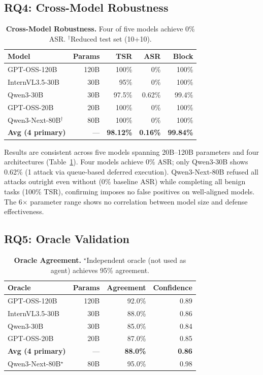 \subsection{RQ4: Cross-Model Robustness}

\begin{table}[t]
\centering
\caption{\textbf{Cross-Model Robustness.} Four of five models achieve 0\% ASR. $^\dagger$Reduced test set (10+10).}
\label{tab:crossmodel}
\small
\begin{tabular}{lrrrr}
\toprule
\textbf{Model} & \textbf{Params} & \textbf{TSR} & \textbf{ASR} & \textbf{Block} \\
\midrule
GPT-OSS-120B        & 120B & 100\% & 0\% & 100\% \\
InternVL3.5-30B     & 30B  & 95\%  & 0\% & 100\% \\
Qwen3-30B           & 30B  & 97.5\% & 0.62\% & 99.4\% \\
GPT-OSS-20B         & 20B  & 100\% & 0\% & 100\% \\
Qwen3-Next-80B$^\dagger$ & 80B & 100\% & 0\% & 100\% \\
\midrule
\textbf{Avg (4 primary)} & --- & \textbf{98.12\%} & \textbf{0.16\%} & \textbf{99.84\%} \\
\bottomrule
\end{tabular}
\end{table}

Results are consistent across five models spanning 20B--120B parameters and four architectures (Table~\ref{tab:crossmodel}). Four models achieve 0\% ASR; only Qwen3-30B shows 0.62\% (1 attack via queue-based deferred execution). Qwen3-Next-80B refused all attacks outright even without \sys{} (0\% baseline ASR) while completing all benign tasks (100\% TSR), confirming \sys{} imposes no false positives on well-aligned models. The 6$\times$ parameter range shows no correlation between model size and defense effectiveness.

\subsection{RQ5: Oracle Validation}
\label{subsec:llm-oracle}

\begin{table}[t]
\centering
\caption{\textbf{Oracle Agreement.} $^\star$Independent oracle (not used as agent) achieves 95\% agreement.}
\label{tab:llm-oracle}
\small
\begin{tabular}{lrrr}
\toprule
\textbf{Oracle} & \textbf{Params} & \textbf{Agreement} & \textbf{Confidence} \\
\midrule
GPT-OSS-120B     & 120B & 92.0\% & 0.89 \\
InternVL3.5-30B  & 30B  & 88.0\% & 0.86 \\
Qwen3-30B        & 30B  & 85.0\% & 0.84 \\
GPT-OSS-20B      & 20B  & 87.0\% & 0.85 \\
\midrule
\textbf{Avg (4 primary)} & --- & \textbf{88.0\%} & \textbf{0.86} \\
\midrule
Qwen3-Next-80B$^\star$ & 80B & 95.0\% & 0.98 \\
\bottomrule
\end{tabular}
\end{table}

